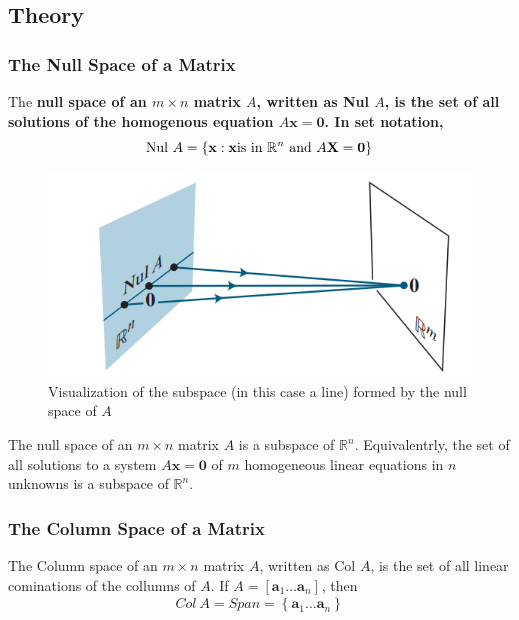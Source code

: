   \subsection*{Theory}
    \subsubsection*{The Null Space of a Matrix}
    
    \begin{mydef}\label{def: null space}
      The \bf{null space} of an $ m × n $ matrix $ A $, written as Nul $ A $, is the set of all solutions of the homogenous equation $ A \mathbf x = \mathbf 0 $. In set notation, 
      \[
      \text{Nul} \ A = \left\{\mathbf x: \mathbf x \text{is in $ \mathbb R^{n} $ and $ A \mathbf X = \mathbf 0 $}\right\}_{}^{} 
      \]
    \end{mydef}    

    \begin{figure}[h!]
      \centering
      \includegraphics[scale = .7]{Bilder/nullspace_figure.png}
      \caption{Visualization of the subspace (in this case a line) formed by the null space of $ A $}
      \label{fig:figure1}
    \end{figure}

    \begin{theorem} \label{theorem: null space}
      The null space of an $ m × n  $ matrix $ A $ is a subspace of $ \mathbb R^{n} $. Equivalentrly, the set of all solutions to a system $ A \mathbf  x = \mathbf  0 $ of $ m  $ homogeneous linear equations in $ n $ unknowns is a subspace of $ \mathbb R^{n} $. 
    \end{theorem}

    \subsubsection*{The Column Space of a Matrix}
      \begin{mydef}\label{def: column space}
        The Column space of an $ m × n $ matrix $ A $, written as Col $ A $, is the set of all linear cominations of the collumns of $ A $. If $ A = \left[\mathbf a_1 \dots \mathbf a_n\right]_{}^{} $, then 
        \[
        Col \ A = Span = \left\{\mathbf a_1 \dots \mathbf a_n\right\}_{}^{} 
        \]
      \end{mydef}

